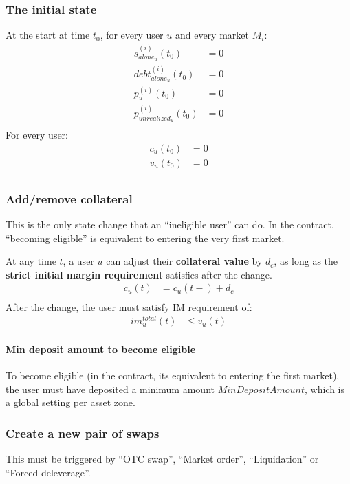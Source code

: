 \documentclass{article}%
\begin{document}
\subsubsection{The initial state}
At the start at time $t_0$, for every user $u$ and every market $M_i$:
    \begin{align*}
        s_{alone_u}^{(i)}(t_0) &= 0\\
        debt_{alone_u}^{(i)}(t_0) &= 0\\
        p_{u}^{(i)}(t_0) &= 0\\
        p_{unrealized_u}^{(i)}(t_0) &= 0\\
    \end{align*}
For every user:
    \begin{align*}
        c_u(t_0) &= 0\\
        v_u(t_0) &= 0\\
    \end{align*}
\subsubsection{Add/remove collateral}
This is the only state change that an ``ineligible user'' can do. In the contract, ``becoming eligible'' is equivalent to entering the very first market. 

At any time $t$, a user $u$ can adjust their \textbf{collateral value} by $d_c$, as long as the \textbf{strict initial margin requirement} satisfies after the change.
    \begin{align*}
        c_u(t) &= c_u(t-) + d_c\\
    \end{align*}
After the change, the user must satisfy IM requirement of:
    \begin{align*}
        im_u^{total}(t) &\leq v_u(t)
    \end{align*}

\paragraph{Min deposit amount to become eligible} To become eligible (in the contract, its equivalent to entering the first market), the user must have deposited a minimum amount $MinDepositAmount$, which is a global setting per asset zone.

\subsubsection{Create a new pair of swaps}
This must be triggered by ``OTC swap'', ``Market order'', ``Liquidation'' or ``Forced deleverage''.
\end{document}
